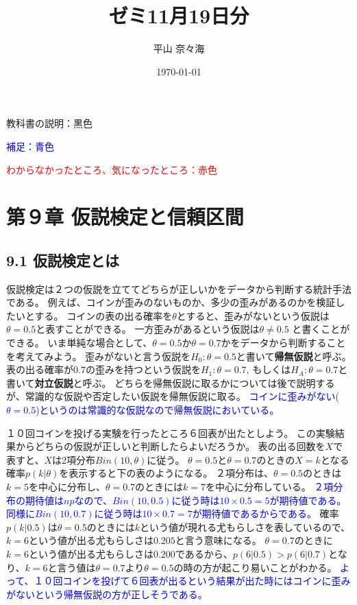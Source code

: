 \documentclass{article}
\title{ゼミ11月19日分}
\author{平山 奈々海}
\date{\today}
\begin{document}
\maketitle

教科書の説明：黒色

\textcolor{blue}{補足：青色}

\textcolor{red}{わからなかったところ、気になったところ：赤色}


\section{第９章 仮説検定と信頼区間}

\subsection{9.1 仮説検定とは}




仮説検定は２つの仮説を立ててどちらが正しいかをデータから判断する統計手法である。
例えば、コインが歪みのないものか、多少の歪みがあるのかを検証したいとする。
コインの表の出る確率を$\theta$とすると、歪みがないという仮説は$\theta = 0.5$と表すことができる。
一方歪みがあるという仮説は$\theta \neq 0.5$ と書くことができる。
いま単純な場合として、$\theta = 0.5$か$\theta = 0.7$かをデータから判断することを考えてみよう。
歪みがないと言う仮説を$H_0: \theta = 0.5$と書いて\textbf{帰無仮説}と呼ぶ。
表の出る確率が$0.7$の歪みを持つという仮説を$H_1: \theta = 0.7$, もしくは$H_A: \theta = 0.7$と書いて\textbf{対立仮説}と呼ぶ。
どちらを帰無仮説に取るかについては後で説明するが、常識的な仮説や否定したい仮説を帰無仮説に取る。
\textcolor{blue}{コインに歪みがない($\theta=0.5$)というのは常識的な仮説なので帰無仮説においている。}



１０回コインを投げる実験を行ったところ６回表が出たとしよう。
この実験結果からどちらの仮説が正しいと判断したらよいだろうか。
表の出る回数を$X$で表すと、$X$は2項分布$Bin(10,\theta)$に従う。
$\theta=0.5$と$\theta=0.7$のときの$X=k$となる確率$p(k|\theta)$を表示すると下の表のようになる。
２項分布は、$\theta=0.5$のときは$k=5$を中心に分布し、$\theta=0.7$のときには$k=7$を中心に分布している。
\textcolor{blue}{２項分布の期待値は$np$なので、$Bin(10,0.5)$に従う時は$10 \times 0.5 = 5$が期待値である。同様に$Bin(10,0.7)$に従う時は$10 \times 0.7 = 7$が期待値であるからである。}
確率$p(k|0.5)$は$\theta=0.5$のときには$k$という値が現れる尤もらしさを表しているので、$k=6$という値が出る尤もらしさは$0.205$と言う意味になる。
$\theta=0.7$のときに$k=6$という値が出る尤もらしさは$0.200$であるから、$p(6|0.5)>p(6|0.7)$となり、$k=6$と言う値は$\theta=0.7$より$\theta=0.5$の時の方が起こり易いことがわかる。
\textcolor{blue}{よって、１０回コインを投げて６回表が出るという結果が出た時にはコインに歪みがないという帰無仮説の方が正しそうである。}
\end{document}
